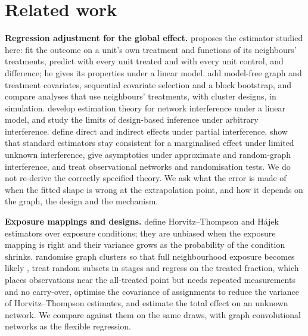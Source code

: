 \section{Related work}\label{sec:related}
\textbf{Regression adjustment for the global effect.}
\citet{chin2019regression} proposes the estimator studied here: fit the outcome on a unit's own treatment and functions of its neighbours' treatments, predict with every unit treated and with every unit control, and difference; he gives its properties under a linear model.
\citet{han2023model} add model-free graph and treatment covariates, sequential covariate selection and a block bootstrap, and \citet{eckles2017design} compare analyses that use neighbours' treatments, with cluster designs, in simulation.
\citet{sussman2017elements} develop estimation theory for network interference under a linear model, and \citet{basse2018limitations} study the limits of design-based inference under arbitrary interference.
\citet{hudgens2008toward} define direct and indirect effects under partial interference, \citet{savje2021average} show that standard estimators stay consistent for a marginalised effect under limited unknown interference, \citet{leung2022causal,li2022random} give asymptotics under approximate and random-graph interference, and \citet{ogburn2022causal,forastiere2021identification,basse2019randomization} treat observational networks and randomisation tests.
We do not re-derive the correctly specified theory. We ask what the error is made of when the fitted shape is wrong at the extrapolation point, and how it depends on the graph, the design and the mechanism.

\textbf{Exposure mappings and designs.}
\citet{aronow2017estimating} define Horvitz--Thompson and Hájek estimators over exposure conditions; they are unbiased when the exposure mapping is right and their variance grows as the probability of the condition shrinks.
\citet{ugander2013graph} randomise graph clusters so that full neighbourhood exposure becomes likely \citep[see also][]{karrer2021network,ugander2023randomized,leung2022rate}, \citet{cortez2022staggered} treat random subsets in stages and regress on the treated fraction, which places observations near the all-treated point but needs repeated measurements and no carry-over, \citet{optcov2023} optimise the covariance of assignments to reduce the variance of Horvitz--Thompson estimates, and \citet{yu2022estimating,shirani2024causal} estimate the total effect on an unknown network. We compare against them on the same draws, with graph convolutional networks \citep{kipf2017semi,defferrard2016convolutional} as the flexible regression.
